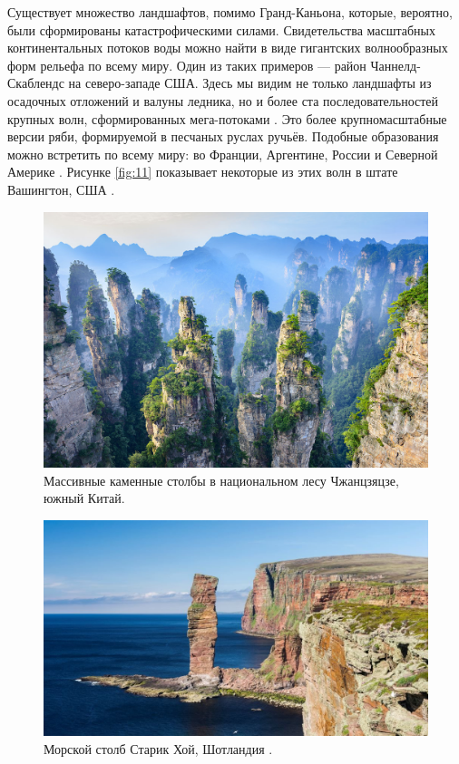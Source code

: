\documentclass[10pt,twocolumn,letterpaper]{article}
\begin{document}
Существует множество ландшафтов, помимо Гранд-Каньона, которые, вероятно, были сформированы катастрофическими силами. Свидетельства масштабных континентальных потоков воды можно найти в виде гигантских волнообразных форм рельефа по всему миру. Один из таких примеров — район Чаннелд-Скаблендс на северо-западе США. Здесь мы видим не только ландшафты из осадочных отложений и валуны ледника, но и более ста последовательностей крупных волн, сформированных мега-потоками \cite{78,79}. Это более крупномасштабные версии ряби, формируемой в песчаных руслах ручьёв. Подобные образования можно встретить по всему миру: во Франции, Аргентине, России и Северной Америке \cite{81}. Рисунке \ref{fig:11} показывает некоторые из этих волн в штате Вашингтон, США \cite{80}.

\begin{figure}[b]
\begin{center}
   \includegraphics[width=1\linewidth]{zhangjiajie.jpg}
\end{center}
   \caption{Массивные каменные столбы в национальном лесу Чжанцзяцзе, южный Китай.}
\label{fig:12}
\label{fig:onecol}
\end{figure}

\begin{figure}[b]
\begin{center}
   \includegraphics[width=1\linewidth]{hoy.jpg}
\end{center}
   \caption{Морской столб Старик Хой, Шотландия \cite{83}.}
\label{fig:13}
\label{fig:onecol}
\end{figure}
\end{document}
